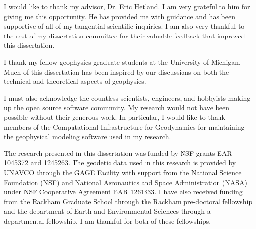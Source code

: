 I would like to thank my advisor, Dr. Eric Hetland. I am very grateful
to him for giving me this opportunity. He has provided me with
guidance and has been supportive of all of my tangential scientific
inquiries. I am also very thankful to the rest of my dissertation
committee for their valuable feedback that improved this dissertation.

I thank my fellow geophysics graduate students at the University of
Michigan. Much of this dissertation has been inspired by our
discussions on both the technical and theoretical aspects of
geophysics.

I must also acknowledge the countless scientists, engineers, and
hobbyists making up the open source software community. My research
would not have been possible without their generous work. In
particular, I would like to thank members of the Computational
Infrastructure for Geodynamics for maintaining the geophysical
modeling software used in my research.

The research presented in this dissertation was funded by NSF grants
EAR 1045372 and 1245263. The geodetic data used in this research is
provided by UNAVCO through the GAGE Facility with support from the
National Science Foundation (NSF) and National Aeronautics and Space
Administration (NASA) under NSF Cooperative Agreement EAR 1261833. I
have also received funding from the Rackham Graduate School through
the Rackham pre-doctoral fellowship and the department of Earth and
Environmental Sciences through a departmental fellowship. I am
thankful for both of these fellowships.



